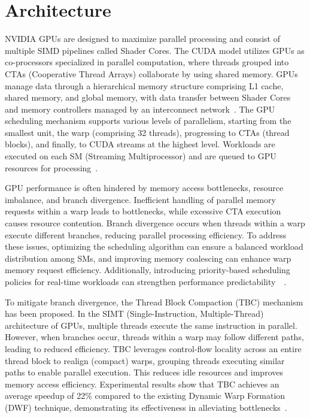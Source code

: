 \section{Architecture}

NVIDIA GPUs are designed to maximize parallel processing and consist of multiple SIMD pipelines called Shader Cores. 
The CUDA model utilizes GPUs as co-processors specialized in parallel computation, where threads grouped into CTAs (Cooperative Thread Arrays) collaborate by using shared memory. 
GPUs manage data through a hierarchical memory structure comprising L1 cache, shared memory, and global memory, with data transfer between Shader Cores and memory controllers managed by an interconnect network~\cite{Bakhoda2009}. 
The GPU scheduling mechanism supports various levels of parallelism, starting from the smallest unit, the warp (comprising 32 threads), progressing to CTAs (thread blocks), and finally, to CUDA streams at the highest level. 
Workloads are executed on each SM (Streaming Multiprocessor) and are queued to GPU resources for processing~\cite{Sanudo2020}.

GPU performance is often hindered by memory access bottlenecks, resource imbalance, and branch divergence. Inefficient handling of parallel memory requests within a warp leads to bottlenecks, while excessive CTA execution causes resource contention. Branch divergence occurs when threads within a warp execute different branches, reducing parallel processing efficiency. To address these issues, optimizing the scheduling algorithm can ensure a balanced workload distribution among SMs, and improving memory coalescing can enhance warp memory request efficiency. Additionally, introducing priority-based scheduling policies for real-time workloads can strengthen performance predictability~\cite{Bakhoda2009}~\cite{Sanudo2020}.

To mitigate branch divergence, the Thread Block Compaction (TBC) mechanism has been proposed. In the SIMT (Single-Instruction, Multiple-Thread) architecture of GPUs, multiple threads execute the same instruction in parallel. However, when branches occur, threads within a warp may follow different paths, leading to reduced efficiency. TBC leverages control-flow locality across an entire thread block to realign (compact) warps, grouping threads executing similar paths to enable parallel execution. This reduces idle resources and improves memory access efficiency. Experimental results show that TBC achieves an average speedup of 22\% compared to the existing Dynamic Warp Formation (DWF) technique, demonstrating its effectiveness in alleviating bottlenecks~\cite{Fung2011HPC}.

